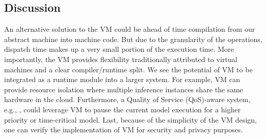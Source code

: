 \subsection{Discussion}


An alternative solution to the VM could be ahead of time compilation from our abstract machine into machine code.
But due to the granularity of the operations, dispatch time makes up a very small portion of the execution time. More importantly, the VM provides flexibility traditionally attributed to virtual machines and a clear compiler/runtime split.
We see the potential of VM to be integrated as a runtime module into a larger system.
For example, VM can provide resource isolation where multiple inference instances share the same hardware in the cloud. Furthermore, a Quality of Service (QoS)-aware system, e.g., \citep{kang2018hotmobile, Yachir2009rsj}, could leverage VM to pause the current model execution for a higher priority or time-critical model. Last, because of the simplicity of the VM design, one can verify the implementation of VM for security and privacy purposes.

